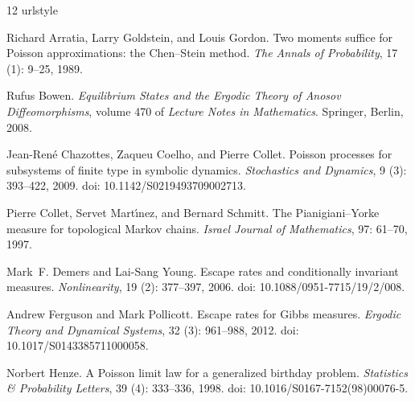 \documentclass[10pt,a4paper]{article}
\theoremstyle{plain}
\theoremstyle{definition}
\theoremstyle{remark}
\begin{document}
\begin{thebibliography}{12}
\providecommand{\natexlab}[1]{#1}
\providecommand{\url}[1]{\texttt{#1}}
\expandafter\ifx\csname urlstyle\endcsname\relax
  \providecommand{\doi}[1]{doi: #1}\else
  \providecommand{\doi}{doi: \begingroup \urlstyle{rm}\Url}\fi

Richard Arratia, Larry Goldstein, and Louis Gordon.
\newblock Two moments suffice for {P}oisson approximations: the {C}hen--{S}tein
  method.
\newblock \emph{The Annals of Probability}, 17 (1): 9--25,
  1989.

Rufus Bowen.
\newblock \emph{Equilibrium States and the Ergodic Theory of Anosov
  Diffeomorphisms}, volume 470 of \emph{Lecture Notes in Mathematics}.
\newblock Springer, Berlin, 2008.

Jean-Ren\'e Chazottes, Zaqueu Coelho, and Pierre Collet.
\newblock Poisson processes for subsystems of finite type in symbolic dynamics.
\newblock \emph{Stochastics and Dynamics}, 9 (3): 393--422,
  2009.
\newblock \doi{10.1142/S0219493709002713}.

Pierre Collet, Servet Mart{\'\i}nez, and Bernard Schmitt.
\newblock The {P}ianigiani--{Y}orke measure for topological {M}arkov chains.
\newblock \emph{Israel Journal of Mathematics}, 97: 61--70, 1997.

Mark~F. Demers and Lai-Sang Young.
\newblock Escape rates and conditionally invariant measures.
\newblock \emph{Nonlinearity}, 19 (2): 377--397, 2006.
\newblock \doi{10.1088/0951-7715/19/2/008}.

Andrew Ferguson and Mark Pollicott.
\newblock Escape rates for {G}ibbs measures.
\newblock \emph{Ergodic Theory and Dynamical Systems}, 32
  (3): 961--988, 2012.
\newblock \doi{10.1017/S0143385711000058}.

Norbert Henze.
\newblock A {P}oisson limit law for a generalized birthday problem.
\newblock \emph{Statistics \& Probability Letters}, 39
  (4): 333--336, 1998.
\newblock \doi{10.1016/S0167-7152(98)00076-5}.


\end{thebibliography}
\end{document}

